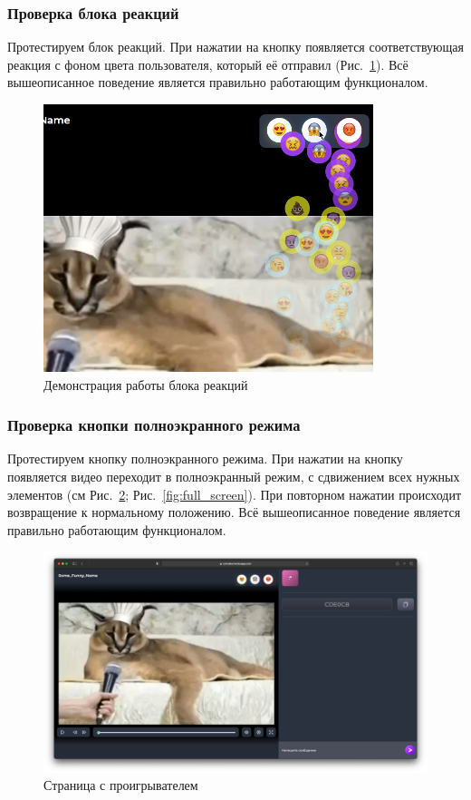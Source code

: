 \documentclass{../../includes/TechDocMultiAuthors}
\begin{document}
    \subsubsection{Проверка блока реакций}

    Протестируем блок реакций.
    При нажатии на кнопку появляется соответствующая реакция с фоном цвета пользователя, который её отправил (Рис.~\ref{fig:reactions}).
    Всё вышеописанное поведение является правильно работающим функционалом.

    \begin{figure}[H]
        \centering
        \includegraphics[width=0.6\linewidth]{../images/reactions.png}
        \caption{Демонстрация работы блока реакций}
        \label{fig:reactions}
    \end{figure}

    \subsubsection{Проверка кнопки полноэкранного режима}

    Протестируем кнопку полноэкранного режима.
    При нажатии на кнопку появляется видео переходит в полноэкранный режим, с сдвижением всех нужных элементов (см Рис.~\ref{fig:player3}; Рис.~\ref{fig:full_screen}).
    При повторном нажатии происходит возвращение к нормальному положению.
    Всё вышеописанное поведение является правильно работающим функционалом.

    \begin{figure}[H]
        \centering
        \includegraphics[width=0.9\linewidth]{../images/player.png}
        \caption{Страница с проигрывателем}
        \label{fig:player3}
    \end{figure}
\end{document}
